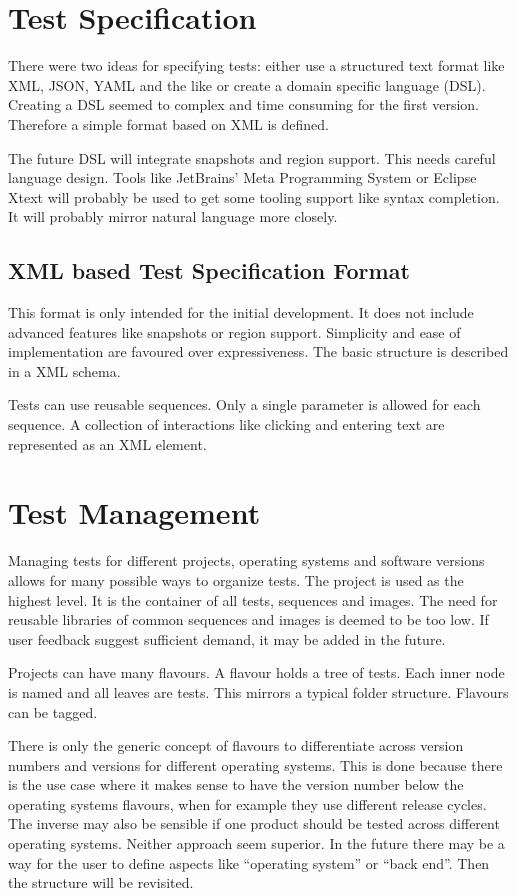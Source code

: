 \documentclass[a4paper,twocolumn]{article}
\begin{document}
\section{Test Specification}
There were two ideas for specifying tests: either use a structured text format like XML, JSON, YAML and the like or create a domain specific language (DSL).
Creating a DSL seemed to complex and time consuming for the first version.
Therefore a simple format based on XML is defined.

The future DSL will integrate snapshots and region support.
This needs careful language design.
Tools like JetBrains' Meta Programming System\cite{MPS}
or Eclipse Xtext\cite{Xtext} will probably be used to get some tooling support like syntax completion.
It will probably mirror natural language more closely.

\subsection{XML based Test Specification Format}
This format is only intended for the initial development.
It does not include advanced features like snapshots or region support.
Simplicity and ease of implementation are favoured over expressiveness.
The basic structure is described in a XML schema.

Tests can use reusable sequences.
Only a single parameter is allowed for each sequence.
A collection of interactions like clicking and entering text are represented as an XML element.

\section{Test Management}
Managing tests for different projects, operating systems and software versions allows for many possible ways to organize tests.
The project is used as the highest level.
It is the container of all tests, sequences and images.
The need for reusable libraries of common sequences and images is deemed to be too low.
If user feedback suggest sufficient demand, it may be added in the future.

Projects can have many flavours.
A flavour holds a tree of tests.
Each inner node is named and all leaves are tests.
This mirrors a typical folder structure.
Flavours can be tagged.

There is only the generic concept of flavours to differentiate across version numbers and versions for different operating systems.
This is done because there is the use case where it makes sense to have the version number below the operating systems flavours, when for example they use different release cycles.
The inverse may also be sensible if one product should be tested across different operating systems.
Neither approach seem superior.
In the future there may be a way for the user to define aspects like \enquote{operating system} or \enquote{back end}. Then the structure will be revisited.
\end{document}
